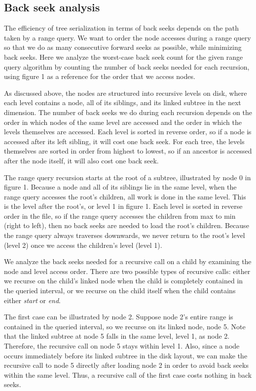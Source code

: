 \documentclass[11pt, oneside]{article}
\newcommand{\ms}{\textit}
\begin{document}
\subsection{Back seek analysis}

The efficiency of tree serialization in terms of back seeks depends on the path
taken by a range query. We want to order the node accesses during a range query
so that we do as many consecutive forward seeks as possible, while minimizing
back seeks. Here we analyze the worst-case back seek count for the given range
query algorithm by counting the number of back seeks needed for each recursion,
using figure 1 as a reference for the order that we access nodes. 

As discussed above, the nodes are structured into recursive levels on disk,
where each level contains a node, all of its siblings, and its linked subtree
in the next dimension. The number of back seeks we do during each recursion
depends on the order in which nodes of the same level are accessed and the
order in which the levels themselves are accessed. Each level is sorted in
reverse order, so if a node is accessed after its left sibling, it will cost
one back seek. For each tree, the levels themselves are sorted in order from
highest to lowest, so if an ancestor is accessed after the node itself, it will
also cost one back seek. 

The range query recursion starts at the root of a subtree, illustrated by node
0 in figure 1. Because a node and all of its siblings lie in the same level,
when the range query accesses the root's children, all work is done in the same
level. This is the level after the root's, or level 1 in figure 1. Each level
is sorted in reverse order in the file, so if the range query accesses the
children from max to min (right to left), then no back seeks are needed to load
the root's children. Because the range query always traverses downwards, we
never return to the root's level (level 2) once we access the children's level
(level 1). 

We analyze the back seeks needed for a recursive call on a child by examining
the node and level access order. There are two possible types of recursive
calls: either we recurse on the child's linked node when the child is
completely contained in the queried interval, or we recurse on the child itself
when the child contains either \ms{start} or \ms{end}.

The first case can be illustrated by node 2. Suppose node 2's entire range is
contained in the queried interval, so we recurse on its linked node, node 5.
Note that the linked subtree at node 5 falls in the same level, level 1, as
node 2.  Therefore, the recursive call on node 5 stays within level 1. Also,
since a node occurs immediately before its linked subtree in the disk layout,
we can make the recursive call to node 5 directly after loading node 2 in order
to avoid back seeks within the same level. Thus, a recursive call of the first
case costs nothing in back seeks.
\end{document}
